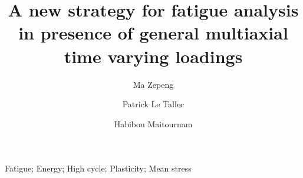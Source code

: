 \documentclass[3p,times,procedia,number]{elsarticle}
\begin{document}
\begin{frontmatter}



\title{A new strategy for fatigue analysis in presence of general multiaxial time varying loadings}




\author[a]{Ma Zepeng}
\author[b]{Patrick Le Tallec}
\author[c]{Habibou Maitournam}

\address[a]{Laboratory of Solid Mechanics, Ecole Polytechnique, 91128 Palaiseau Cedex, France}
\address[b]{Laboratory of Solid Mechanics, Ecole Polytechnique, 91128 Palaiseau Cedex, France}
\address[c]{IMSIA, ENSTA ParisTech, CNRS, CEA, EDF, Université Paris-Saclay, 828 bd des Maréchaux, 91762 Palaiseau cedex France}

\tableofcontents
\newpage


\begin{keyword}
Fatigue; Energy; High cycle; Plasticity; Mean stress




\end{keyword}


\end{frontmatter}
\end{document}
